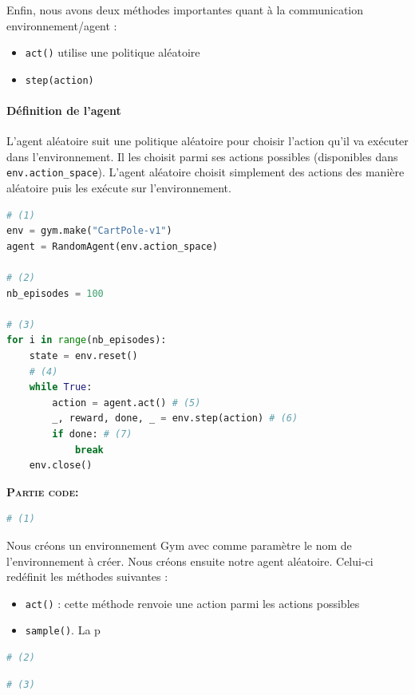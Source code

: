 \documentclass[10pt,a4paper]{article}
\begin{document}
Enfin, nous avons deux méthodes importantes quant à la communication environnement/agent :
\begin{itemize}
	\item \lstinline{act()} utilise une politique aléatoire
	\item \lstinline{step(action)} 
\end{itemize}

\paragraph{Définition de l'agent}

L'agent aléatoire suit une politique aléatoire pour choisir l'action qu'il va exécuter dans l'environnement. Il les choisit parmi ses actions possibles (disponibles dans \lstinline{env.action_space}). L'agent aléatoire choisit simplement des actions des manière aléatoire puis les exécute sur l'environnement.

\begin{lstlisting}[language=Python, caption=Programme principal de l'agent aléatoire]
# (1)
env = gym.make("CartPole-v1")
agent = RandomAgent(env.action_space)

# (2)
nb_episodes = 100

# (3)
for i in range(nb_episodes):
    state = env.reset()
    # (4)
    while True:
        action = agent.act() # (5)
        _, reward, done, _ = env.step(action) # (6)
        if done: # (7)
            break
    env.close()
\end{lstlisting}


\textbf{\textsc{Partie code:}}
\begin{lstlisting}[language=Python]
# (1)
\end{lstlisting}
Nous créons un environnement Gym avec comme paramètre le nom de l'environnement à créer. Nous créons ensuite notre agent aléatoire. Celui-ci redéfinit les méthodes suivantes :
\begin{itemize}
	\item \lstinline{act()} : cette méthode renvoie une action parmi les actions possibles
	\item \lstinline{sample()}. La p
\end{itemize}

\begin{lstlisting}[language=Python]
# (2)
\end{lstlisting}

\begin{lstlisting}[language=Python]
# (3)
\end{lstlisting}
\end{document}
